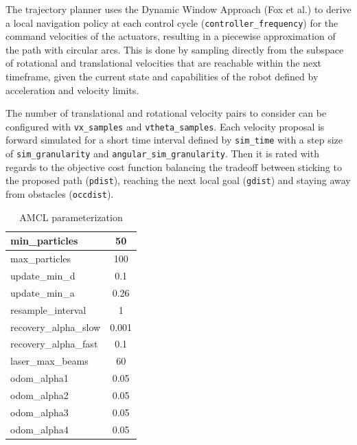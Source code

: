 \documentclass[10pt,journal,compsoc]{IEEEtran}
\begin{document}
The trajectory planner uses the Dynamic Window Approach (Fox et al.\cite{Fox-1997-16403}) to derive a local navigation policy at each control cycle (\texttt{controller\_frequency}) for the command velocities of the actuators, resulting in a piecewise approximation of the path with circular arcs.
This is done by sampling directly from the subspace of rotational and translational velocities that are reachable within the next timeframe, given the current state and capabilities of the robot defined by acceleration and velocity limits.

The number of translational and rotational velocity pairs to consider can be configured with \texttt{vx\_samples} and \texttt{vtheta\_samples}. Each velocity proposal is forward simulated for a short time interval defined by \texttt{sim\_time} with a step size of \texttt{sim\_granularity} and \texttt{angular\_sim\_granularity}.
Then it is rated with regards to the objective cost function balancing the tradeoff between sticking to the proposed path (\texttt{pdist}), reaching the next local goal (\texttt{gdist}) and staying away from obstacles (\texttt{occdist}).


\begin{table}[h]
      \caption{AMCL parameterization}
      \label{tab:amcl_parameterization}
      \begin{center}
            \begin{tabular}{|l|c|}  \hline
min\_particles & 50 \\ \hline
max\_particles & 100 \\ \hline
update\_min\_d & 0.1 \\ \hline
update\_min\_a & 0.26 \\ \hline
resample\_interval & 1 \\ \hline
recovery\_alpha\_slow & 0.001 \\ \hline
recovery\_alpha\_fast & 0.1 \\ \hline

laser\_max\_beams & 60 \\ \hline
odom\_alpha1 & 0.05 \\ \hline
odom\_alpha2 & 0.05 \\ \hline
odom\_alpha3 & 0.05 \\ \hline
odom\_alpha4 & 0.05 \\ \hline
\end{tabular}
\end{center}
\end{table}                  
\end{document}
